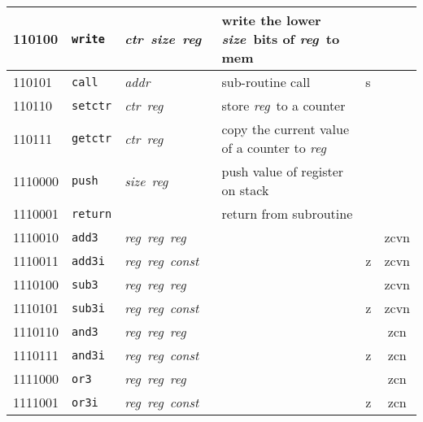 \documentclass[architecture]{compas2018}
\newcommand{\reg}{\textit{reg}}
\newcommand{\const}{\textit{const}}
\newcommand{\ctr}{\textit{ctr}}
\newcommand{\size}{\textit{size}}
\newcommand{\addr}{\textit{addr}}
\begin{document}
\begin{table}[!h]
\begin{center}
\begin{tabular}{|l|l|l|l|l|c|}
    \hline
    110100  & \texttt{write}  & \ctr\ \size\ \reg\            & write the lower \size\ bits of \reg\ to mem          &      &             \\
    \hline
    110101  & \texttt{call}   & \addr\                        & sub-routine call                                     & s    &             \\
    \hline
    110110  & \texttt{setctr} & \ctr\ \reg\                   & store \reg\ to a counter                             &      &             \\
    \hline
    110111  & \texttt{getctr} & \ctr\ \reg\                   & copy the current value of a counter to \reg\         &      &             \\
    \hline
    1110000 & \texttt{push}   & \size\ \reg\                  & push value of register on stack                      &      &             \\
    \hline
    1110001 & \texttt{return} &                               & return from subroutine                               &      &             \\
    \hline
    1110010 & \texttt{add3}   & \reg\ \reg\ \reg\             &                                                      &      & zcvn        \\
    \hline
    1110011 & \texttt{add3i}  & \reg\ \reg\ \const\           &                                                      & z    & zcvn        \\
    \hline
    1110100 & \texttt{sub3}   & \reg\ \reg\ \reg\             &                                                      &      & zcvn        \\
    \hline
    1110101 & \texttt{sub3i}  & \reg\ \reg\ \const\           &                                                      & z    & zcvn        \\
    \hline
    1110110 & \texttt{and3}   & \reg\  \reg\ \reg\            &                                                      &      & zcn         \\
    \hline
    1110111 & \texttt{and3i}  & \reg\ \reg\ \const\           &                                                      & {z}  & zcn         \\
    \hline
    1111000 & \texttt{or3}    & \reg\ \reg\ \reg\             &                                                      &      & zcn         \\
    \hline
    1111001 & \texttt{or3i}   & \reg\ \reg\ \const\           &                                                      & {z}  & zcn         \\

\end{tabular}
\end{center}
\end{table}
\end{document}
